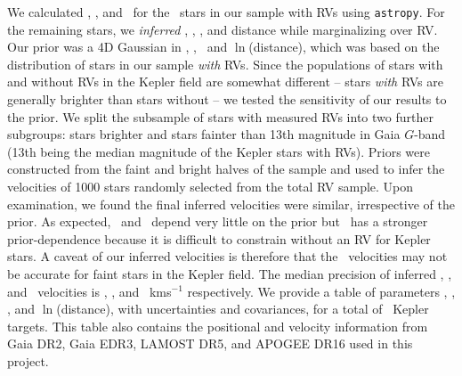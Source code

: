 We calculated \vx, \vy, and \vz\ for the \nrv\ stars in our sample with RVs
using {\tt astropy}.
For the remaining stars, we {\it inferred} \vx, \vy, \vz, and distance while
marginalizing over RV.
Our prior was a 4D Gaussian in \vx, \vy, \vz\ and $\ln$(distance), which was
based on the distribution of stars in our sample {\it with} RVs.
Since the populations of stars with and without RVs in the Kepler field are
somewhat different -- stars {\it with} RVs are generally brighter than stars
without -- we tested the sensitivity of our results to the prior.
We split the subsample of stars with measured RVs into two further subgroups:
stars brighter and stars fainter than 13th magnitude in Gaia $G$-band (13th
being the median magnitude of the Kepler stars with RVs).
Priors were constructed from the faint and bright halves of the sample and
used to infer the velocities of 1000 stars randomly selected from the total RV
sample.
Upon examination, we found the final inferred velocities were similar,
irrespective of the prior.
As expected, \vx\ and \vz\ depend very little on the prior but \vy\ has a
stronger prior-dependence because it is difficult to constrain without an RV
for Kepler stars.
A caveat of our inferred velocities is therefore that the \vy\ velocities may
not be accurate for faint stars in the Kepler field.
The median precision of inferred \vx, \vy, and \vz\ velocities is
\vxprecision, \vyprecision, and \vzprecision\ kms$^{-1}$ respectively.
We provide a table of parameters \vx, \vy, \vz, and $\ln$(distance), with
uncertainties and covariances, for a total of \nstars\ Kepler targets.
This table also contains the positional and velocity information from Gaia
DR2, Gaia EDR3, LAMOST DR5, and APOGEE DR16 used in this project.
